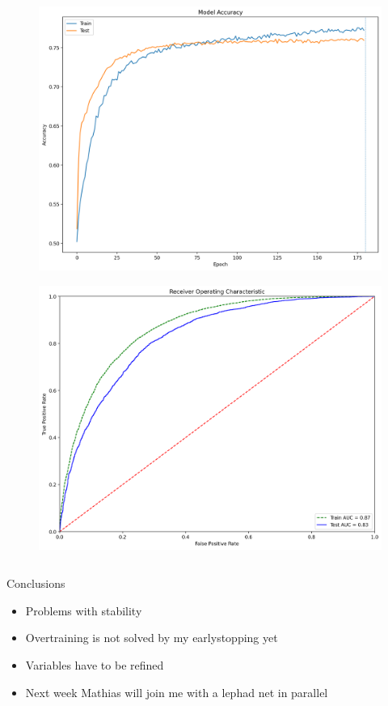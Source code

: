 \documentclass{beamer}
\begin{document}
\begin{frame}
\begin{columns}
        \begin{column}{0.5\textwidth}
            \begin{figure}
                \centering
                \includegraphics[width = \textwidth]{acc}
            \end{figure}
            \begin{figure}
                \centering
                \includegraphics[width = \textwidth]{ROC}
            \end{figure}
        \end{column}
    \end{columns}
\end{frame}

\begin{frame}{Conclusions}
    \begin{itemize}
        \item Problems with stability
        \item Overtraining is not solved by my earlystopping yet
        \item Variables have to be refined
        \item Next week Mathias will join me with a lephad net in parallel
    \end{itemize}
\end{frame}
%
%
%
%
\end{document}
